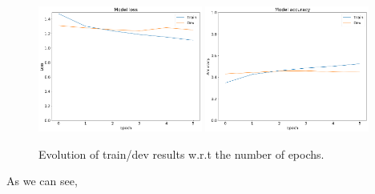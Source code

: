 \documentclass[11pt]{enpc-article}
\begin{document}
\begin{figure}[H]
  \centering
  \includegraphics[width=0.48\textwidth]{learning_curve_innovate.png}
  \includegraphics[width=0.48\textwidth]{learning_curve_accuracy_innovate.png}
  \caption{Evolution of train/dev results w.r.t the number of epochs.}
\end{figure}

As we can see,
\end{document}
